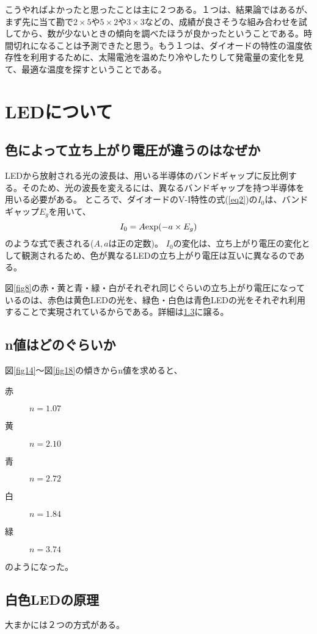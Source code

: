 \documentclass[11pt]{ltjsarticle}
\newcommand{\fr}[1]{図\ref{#1}}
\begin{document}
	こうやればよかったと思ったことは主に２つある。１つは、結果論ではあるが、まず先に当て勘で$2\times5$や$5\times2$や$3\times3$などの、成績が良さそうな組み合わせを試してから、数が少ないときの傾向を調べたほうが良かったということである。時間切れになることは予測できたと思う。もう１つは、ダイオードの特性の温度依存性を利用するために、太陽電池を温めたり冷やしたりして発電量の変化を見て、最適な温度を探すということである。

\section{LEDについて}
	\subsection{色によって立ち上がり電圧が違うのはなぜか}
		LEDから放射される光の波長は、用いる半導体のバンドギャップに反比例する。そのため、光の波長を変えるには、異なるバンドギャップを持つ半導体を用いる必要がある。
		ところで、ダイオードのV-I特性の式(\ref{eq2})の$I_0$は、バンドギャップ$E_g$を用いて、
		\[
			I_0 = A {\rm exp}(-a \times E_g)
		\]
		のような式で表される($A,a$は正の定数)。
		$I_0$の変化は、立ち上がり電圧の変化として観測されるため、色が異なるLEDの立ち上がり電圧は互いに異なるのである。
		
		\fr{fig8}の赤・黄と青・緑・白がそれぞれ同じぐらいの立ち上がり電圧になっているのは、赤色は黄色LEDの光を、緑色・白色は青色LEDの光をそれぞれ利用することで実現されているからである。詳細は\ref{sec2}に譲る。
	
	\subsection{n値はどのぐらいか}
		\fr{fig14}〜\fr{fig18}の傾きからn値を求めると、
		
		\begin{description}
			\item[赤] $n=1.07$
			\item[黄] $n=2.10$
			\item[青] $n=2.72$
			\item[白] $n=1.84$
			\item[緑] $n=3.74$
		\end{description}
		
		のようになった。
	\subsection{白色LEDの原理}
		\label{sec2}
		大まかには２つの方式がある。
		
\end{document}
